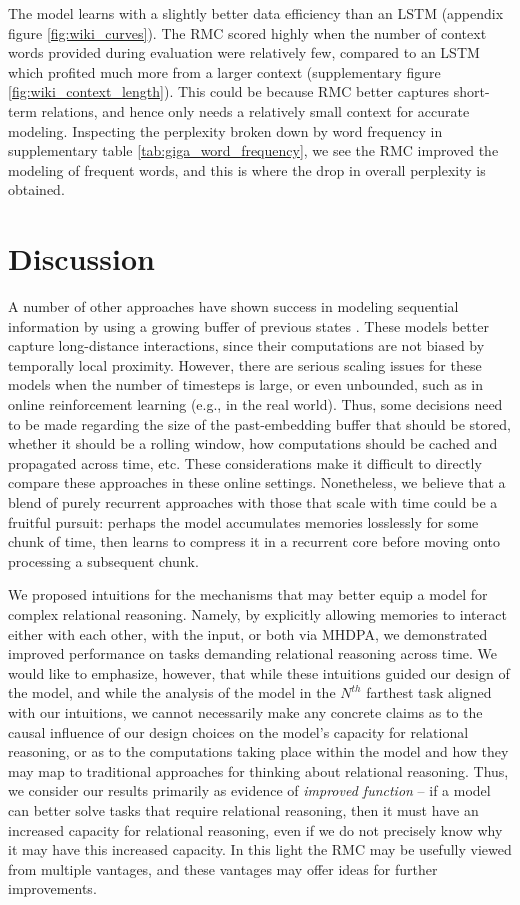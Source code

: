 \documentclass{article}
\begin{document}
The model learns with a slightly better data efficiency than an LSTM (appendix figure \ref{fig:wiki_curves}). The RMC scored highly when the number of context words provided during evaluation were relatively few, compared to an LSTM which profited much more from a larger context (supplementary figure \ref{fig:wiki_context_length}). This could be because RMC better captures short-term relations, and hence only needs a relatively small context for accurate modeling. Inspecting the perplexity broken down by word frequency in supplementary table \ref{tab:giga_word_frequency}, we see the RMC improved the modeling of frequent words, and this is where the drop in overall perplexity is obtained.  \section{Discussion}
A number of other approaches have shown success in modeling sequential information by using a growing buffer of previous states \citep{BahdanauCB14, vaswani2017attention}. These models better capture long-distance interactions, since their computations are not biased by temporally local proximity. However, there are serious scaling issues for these models when the number of timesteps is large, or even unbounded, such as in online reinforcement learning (e.g., in the real world). Thus, some decisions need to be made regarding the size of the past-embedding buffer that should be stored, whether it should be a rolling window, how computations should be cached and propagated across time, etc. These considerations make it difficult to directly compare these approaches in these online settings. Nonetheless, we believe that a blend of purely recurrent approaches with those that scale with time could be a fruitful pursuit: perhaps the model accumulates memories losslessly for some chunk of time, then learns to compress it in a recurrent core before moving onto processing a subsequent chunk. 

We proposed intuitions for the mechanisms that may better equip a model for complex relational reasoning. Namely, by explicitly allowing memories to interact either with each other, with the input, or both via MHDPA, we demonstrated improved performance on tasks demanding relational reasoning across time. We would like to emphasize, however, that while these intuitions guided our design of the model, and while the analysis of the model in the $N^{th}$ farthest task aligned with our intuitions, we cannot necessarily make any concrete claims as to the causal influence of our design choices on the model's capacity for relational reasoning, or as to the computations taking place within the model and how they may map to traditional approaches for thinking about relational reasoning. Thus, we consider our results primarily as evidence of \textit{improved function} -- if a model can better solve tasks that require relational reasoning, then it must have an increased capacity for relational reasoning, even if we do not precisely know why it may have this increased capacity. In this light the RMC may be usefully viewed from multiple vantages, and these vantages may offer ideas for further improvements. 
\end{document}
